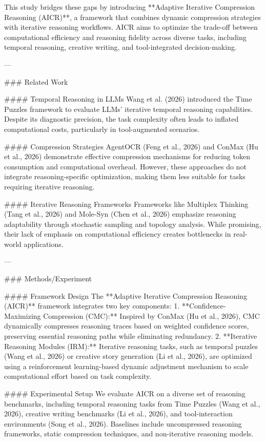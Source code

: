 This study bridges these gaps by introducing **Adaptive Iterative Compression Reasoning (AICR)**, a framework that combines dynamic compression strategies with iterative reasoning workflows. AICR aims to optimize the trade-off between computational efficiency and reasoning fidelity across diverse tasks, including temporal reasoning, creative writing, and tool-integrated decision-making.

---

### Related Work  

#### Temporal Reasoning in LLMs  
Wang et al. (2026) introduced the Time Puzzles framework to evaluate LLMs' iterative temporal reasoning capabilities. Despite its diagnostic precision, the task complexity often leads to inflated computational costs, particularly in tool-augmented scenarios.  

#### Compression Strategies  
AgentOCR (Feng et al., 2026) and ConMax (Hu et al., 2026) demonstrate effective compression mechanisms for reducing token consumption and computational overhead. However, these approaches do not integrate reasoning-specific optimization, making them less suitable for tasks requiring iterative reasoning.  

#### Iterative Reasoning Frameworks  
Frameworks like Multiplex Thinking (Tang et al., 2026) and Mole-Syn (Chen et al., 2026) emphasize reasoning adaptability through stochastic sampling and topology analysis. While promising, their lack of emphasis on computational efficiency creates bottlenecks in real-world applications.  

---

### Methods/Experiment  

#### Framework Design  
The **Adaptive Iterative Compression Reasoning (AICR)** framework integrates two key components:  
1. **Confidence-Maximizing Compression (CMC):** Inspired by ConMax (Hu et al., 2026), CMC dynamically compresses reasoning traces based on weighted confidence scores, preserving essential reasoning paths while eliminating redundancy.  
2. **Iterative Reasoning Modules (IRM):** Iterative reasoning tasks, such as temporal puzzles (Wang et al., 2026) or creative story generation (Li et al., 2026), are optimized using a reinforcement learning-based dynamic adjustment mechanism to scale computational effort based on task complexity.  

#### Experimental Setup  
We evaluate AICR on a diverse set of reasoning benchmarks, including temporal reasoning tasks from Time Puzzles (Wang et al., 2026), creative writing benchmarks (Li et al., 2026), and tool-interaction environments (Song et al., 2026). Baselines include uncompressed reasoning frameworks, static compression techniques, and non-iterative reasoning models.  

